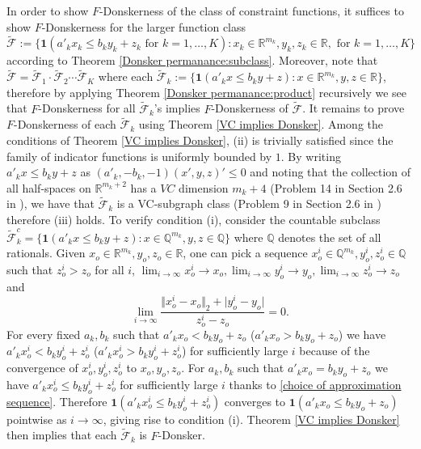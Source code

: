 \documentclass[mnsc,blindrev]{informs4} %
\newcommand{\R}{\mathbb{R}}
\begin{document}
In order to show $F$-Donskerness of the class of constraint functions, it suffices to show $F$-Donskerness for the larger function class $\tilde{\mathcal F}:=\{\mathbf{1}(a'_kx_k\leq b_ky_k+z_k\text{ for }k=1,\ldots,K):x_k\in\R^{m_k},y_k,z_k\in\R,\text{ for }k=1,\ldots,K\}$ according to Theorem \ref{Donsker permanance:subclass}. Moreover, note that $\tilde{\mathcal F}=\tilde{\mathcal F}_1\cdot\tilde{\mathcal F}_2 \cdots \tilde{\mathcal F}_K$ where each $\tilde{\mathcal F}_k:=\{\mathbf{1}(a'_kx\leq b_ky+z):x\in\R^{m_k},y,z\in\R\}$, therefore by applying Theorem \ref{Donsker permanance:product} recursively we see that $F$-Donskerness for all $\tilde{\mathcal F}_k$'s implies $F$-Donskerness of $\tilde{\mathcal F}$. It remains to prove $F$-Donskerness of each $\tilde{\mathcal F}_k$ using Theorem \ref{VC implies Donsker}. Among the conditions of Theorem \ref{VC implies Donsker}, (ii) is trivially satisfied since the family of indicator functions is uniformly bounded by $1$. By writing $a'_kx\leq b_ky+z$ as $(a'_k, -b_k,-1) (x',y,z)' \leq 0$ and noting that the collection of all half-spaces on $\R^{m_k+2}$ has a $VC$ dimension $m_k+4$ (Problem 14 in Section 2.6 in \cite{van1996weak}), we have that $\tilde{\mathcal F}_k$ is a VC-subgraph class (Problem 9 in Section 2.6 in \cite{van1996weak}) therefore (iii) holds. To verify condition (i), consider the countable subclass $\tilde{\mathcal F}_k^c=\{\mathbf{1}(a'_kx\leq b_ky+z):x\in\mathbb Q^{m_k},y,z\in\mathbb Q\}$ where $\mathbb Q$ denotes the set of all rationals. Given $x_o\in \R^{m_k},y_o,z_o\in \R$, one can pick a sequence $x^i_o\in\mathbb Q^{m_k},y^i_o,z^i_o\in\mathbb Q$ such that $z^i_o>z_o$ for all $i$, $\lim_{i\to\infty }x^i_o\to x_o,\lim_{i\to\infty }y^i_o\to y_o,\lim_{i\to\infty }z^i_o\to z_o$ and
\begin{equation}\label{choice of approximation sequence}
\lim_{i\to\infty}\frac{\Vert x^i_o-x_o\Vert_2+\lvert y^i_o-y_o\rvert}{z^i_o-z_o}=0.
\end{equation}
For every fixed $a_k,b_k$ such that $a'_kx_o< b_ky_o+z_o$ ($a'_kx_o> b_ky_o+z_o$) we have $a'_kx^i_o< b_ky^i_o+z^i_o$ ($a'_kx^i_o> b_ky^i_o+z^i_o$) for sufficiently large $i$ because of the convergence of $x^i_o,y^i_o,z^i_o$ to $x_o,y_o,z_o$. For $a_k,b_k$ such that $a'_kx_o= b_ky_o+z_o$ we have $a'_kx^i_o\leq b_ky^i_o+z^i_o$ for sufficiently large $i$ thanks to \eqref{choice of approximation sequence}. Therefore $\mathbf{1}(a'_kx^i_o\leq b_ky^i_o+z^i_o)$ converges to $\mathbf{1}(a'_kx_o\leq b_ky_o+z_o)$ pointwise as $i\to\infty$, giving rise to condition (i). Theorem \ref{VC implies Donsker} then implies that each $\tilde{\mathcal F}_k$ is $F$-Donsker.
\end{document}
